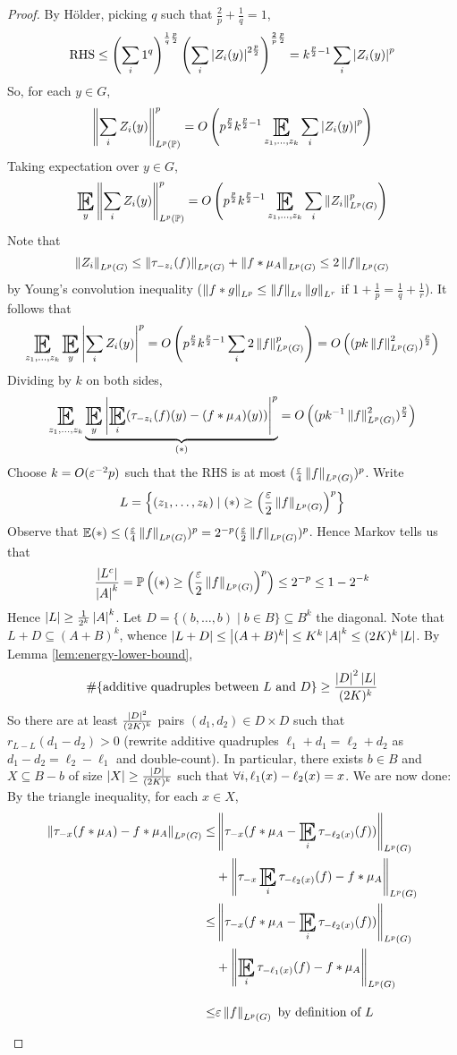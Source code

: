 \documentclass{article}
\begin{document}
\begin{proof}
  By Hölder, picking $q$ such that $\frac 2p + \frac 1q = 1$,
  $$\mathrm{RHS} \le \left(\sum_i 1^q\right)^{\frac 1q\frac p2}\left(\sum_i \left\lvert Z_i(y)\right\rvert^{2\frac p2}\right)^{\frac 2p\frac p2} = k^{\frac p2 - 1} \sum_i \left\lvert Z_i(y)\right\rvert^p$$
  So, for each $y \in G$,
  $$\norm{\sum_i Z_i(y)}_{L^p(\P)}^p = O\left(p^{\frac p2}k^{\frac p2 - 1} \E_{z_1, \dots, z_k} \sum_i \abs{Z_i(y)}^p\right)$$
  Taking expectation over $y \in G$,
  $$\E_y \norm{\sum_i Z_i(y)}_{L^p(\P)}^p = O\left(p^{\frac p2}k^{\frac p2 - 1} \E_{z_1, \dots, z_k} \sum_i \norm{Z_i}_{L^p(G)}^p\right)$$
  Note that
  $$\left\lVert Z_i\right\rVert_{L^p(G)} \le \left\lVert \tau_{-z_i}(f)\right\rVert_{L^p(G)} + \left\lVert f \ast \mu_A\right\rVert_{L^p(G)} \le 2\left\lVert f\right\rVert_{L^p(G)}$$
  by Young's convolution inequality ($\left\lVert f \ast g\right\rVert_{L^p} \le \left\lVert f\right\rVert_{L^q}\left\lVert g\right\rVert_{L^r}$ if $1 + \frac 1p = \frac 1q + \frac 1r$). It follows that
  $$\E_{z_1, \dots, z_k} \E_y \abs{\sum_i Z_i(y)}^p = O\left(p^{\frac p2} k^{\frac p2 - 1} \sum_i 2\norm f_{L^p(G)}^p\right) = O\left((pk \norm f_{L^p(G)}^2)^{\frac p2}\right)$$
  Dividing by $k$ on both sides,
  $$\E_{z_1, \dots, z_k} \underbrace{\E_y \abs{\E_i (\tau_{-z_i}(f)(y) - (f \ast \mu_A)(y))}^p}_{(*)} = O\left((pk^{-1} \norm f_{L^p(G)}^2)^{\frac p2}\right)$$
  Choose $k = O(\varepsilon^{-2}p)$ such that the RHS is at most $(\frac{\varepsilon} 4 \left\lVert f\right\rVert_{L^p(G)})^p$. Write
  $$L = \left\{(z_1, \dots, z_k) \mid (*) \ge \left(\frac{\varepsilon} 2 \left\lVert f\right\rVert_{L^p(G)}\right)^p\right\}$$
  Observe that $\E (*) \le (\frac\eps 4 \norm f_{L^p(G)})^p = 2^{-p}(\frac\eps 2 \norm f_{L^p(G)})^p$. Hence Markov tells us that
  $$\frac{\left\lvert L^c\right\rvert}{\left\lvert A\right\rvert^k} = \mathbb P\left((*) \ge \left(\frac{\varepsilon} 2 \left\lVert f\right\rVert_{L^p(G)}\right)^p\right) \le 2^{-p} \le 1 - 2^{-k}$$
  Hence $\left\lvert L\right\rvert \ge \frac 1{2^k} \left\lvert A\right\rvert^k$. Let $D = \{(b, \dots, b) \mid b \in B\} \subseteq B^k$ the diagonal. Note that $L + D \subseteq (A + B)^k$, whence $\left\lvert L + D\right\rvert \le \left\lvert (A + B)^k\right\rvert \le K^k\left\lvert A\right\rvert^k \le (2K)^k\left\lvert L\right\rvert$. By Lemma \ref{lem:energy-lower-bound},
  $$\#\{\text{additive quadruples between $L$ and $D$}\} \ge \frac{\left\lvert D\right\rvert^2\left\lvert L\right\rvert}{(2K)^k}$$
  So there are at least $\frac{\left\lvert D\right\rvert^2}{(2K)^k}$ pairs $(d_1, d_2) \in D \times D$ such that $r_{L - L}(d_1 - d_2) > 0$ (rewrite additive quadruples $\ell_1 + d_1 = \ell_2 + d_2$ as $d_1 - d_2 = \ell_2 - \ell_1$ and double-count). In particular, there exists $b \in B$ and $X \subseteq B - b$ of size $\left\lvert X\right\rvert \ge \frac{\left\lvert D\right\rvert}{(2K)^k}$ such that $\forall i, \ell_1(x) - \ell_2(x) = x$. We are now done: By the triangle inequality, for each $x \in X$,
  \begin{align*}
    \norm{\tau_{-x}(f \ast \mu_A) - f \ast \mu_A}_{L^p(G)}
    \le & \norm{\tau_{-x}(f \ast \mu_A - \E_i \tau_{-\ell_2(x)}(f))}_{L^p(G)} \\
    & + \norm{\tau_{-x}\E_i \tau_{-\ell_2(x)}(f) - f \ast \mu_A}_{L^p(G)} \\
    \le & \norm{\tau_{-x}(f \ast \mu_A - \E_i \tau_{-\ell_2(x)}(f))}_{L^p(G)} \\
    & + \norm{\E_i \tau_{-\ell_1(x)}(f) - f \ast \mu_A}_{L^p(G)} \\
    \le & \eps \norm f_{L^p(G)} \text{ by definition of }L
  \end{align*}
\end{proof}
\end{document}
